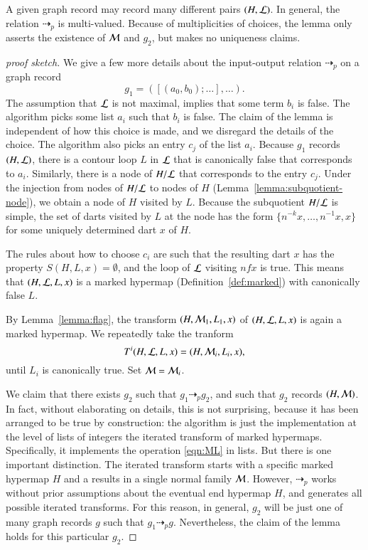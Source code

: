 \begin{remark}
  A given graph record may record many different pairs $(H,{\cal L})$.
  In general, the relation $\dashrightarrow_p$ is multi-valued.
  Because of multiplicities of choices, the lemma only asserts the
  existence of ${\cal M}$ and $g_2$, but makes no uniqueness claims.
\end{remark}

\begin{proof}[proof sketch]
We give a few more details about the input-output relation
$\dashrightarrow_p$ on a graph record 
\[
g_1 = ([(a_0,b_0);\ldots],\ldots).
\]
The assumption that ${\cal L}$ is not maximal, implies that some term
$b_i$ is false.  The algorithm picks some list $a_i$ such that $b_i$
is false.  The claim of the lemma is independent of how this choice is
made, and we disregard the details of the choice.  The algorithm also
picks an entry $c_j$ of the list $a_i$.  Because $g_1$ records
$(H,{\cal L})$, there is a contour loop $L$ in ${\cal L}$ that is
canonically false that corresponds to $a_i$.  Similarly, there is a
node of $H/{\cal L}$ that corresponds to the entry $c_j$.  Under the
injection from nodes of $H/{\cal L}$ to nodes of $H$
(Lemma~\ref{lemma:subquotient-node}), we obtain a node of $H$ visited
by $L$.  Because the subquotient $H/{\cal L}$ is simple, the set of
darts visited by $L$ at the node has the form $\{n^{-k}
x,\ldots,n^{-1}x,x\}$ for some uniquely determined dart $x$ of $H$.

The rules about how to choose $c_i$ are such that the resulting dart
$x$ has the property $S(H,L,x)=\emptyset$, and the loop of ${\cal L}$
visiting $n f x$ is true.  This means that $(H,{\cal L},L,x)$ is a
marked hypermap (Definition~\ref{def:marked}) with canonically false
$L$.

By Lemma~\ref{lemma:flag}, the transform $(H,{\cal M}_1,L_1,x)$ of
$(H,{\cal L},L,x)$ is again a marked hypermap.  We repeatedly take the
tranform
\[
T^i(H,{\cal L},L,x) = (H,{\cal M}_i,L_i,x),
\]
until $L_i$ is canonically true.  Set ${\cal M}={\cal M}_i$.

We claim that there exists $g_2$ such that $g_1 \dashrightarrow_p
g_2$, and such that $g_2$ records $(H,{\cal M})$.  In fact, without
elaborating on details, this is not surprising, because it has been
arranged to be true by construction: the algorithm is just the
implementation at the level of lists of integers the iterated
transform of marked hypermaps.  Specifically, it implements the
operation \eqref{eqn:ML} in lists.  But there is one important
distinction.  The iterated transform starts with a specific marked
hypermap $H$ and a results in a single normal family ${\cal M}$.
However, $\dashrightarrow_p$ works without prior assumptions about the
eventual end hypermap $H$, and generates all possible iterated
transforms.  For this reason, in general, $g_2$ will be just one of
many graph records $g$ such that $g_1\dashrightarrow_p g$.  Nevertheless,
the claim of the lemma holds for this particular $g_2$.
\end{proof}

